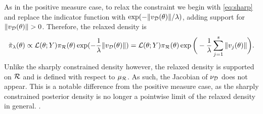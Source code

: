\documentclass[10pt,fleqn]{article}
\newcommand{\aki}[1]{{\color{green}{#1}}}
\DeclareMathOperator{\1}{\mathbbm{1}} \DeclareMathOperator{\bigO}{\mc O}
\begin{document}
As in the positive measure case, to relax the constraint we begin with \eqref{eq:sharp} and replace the
indicator function with $\exp(-\|v_{\mathcal{D}} (\theta)\|/\lambda)$, adding
support for  $\|v_{\mc D}(\theta)\|>0$.  Therefore, the relaxed density is 
\begin{equation}
\label{EQ:relaxedDensityZeroMeasure}
 \tilde{\pi}_\lambda (\theta) \propto \mathcal{L}(\theta;Y)\pi_{\mathcal{R}}(\theta) \exp(-\frac{1}{\lambda} \| v_{\mathcal{D}}(\theta) \|) =\mathcal{L}(\theta;Y)\pi_{\mathcal{R}}(\theta) \exp\bigg(-\frac{1}{\lambda}  \sum_{j=1}^s \| v_j(\theta)\|\bigg) .
 \end{equation} Unlike the sharply constrained density however, the relaxed density is supported on $\mathcal{R}$ and is defined with respect to $\mu_{\mathcal{R}}$.  As such, the Jacobian of $\nu_{\mathcal{D}}$ does not appear. \aki{This statement "As such..." is not at all a clear explanation of what is going on.} This is a notable difference from the positive measure case, as the sharply constrained posterior density is no longer a pointwise limit of the relaxed density in general. \aki{I think we need to explain \& justify the approach more carefully here. It is hard to argue that the (lack of) Jacobian term is an advantage but maybe we can argue that it is just a feature of our approach}.


\end{document}
